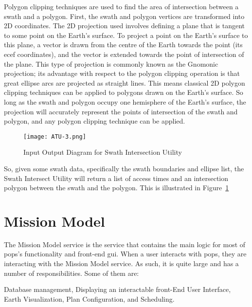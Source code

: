 Polygon clipping techniques are used to find the area of intersection between a
swath and a polygon. First, the swath and polygon vertices are transformed into
2D coordinates. The 2D projection used involves defining a plane that is
tangent to some point on the Earth’s surface.  To project a point on the
Earth’s surface to this plane, a vector is drawn from the centre of the Earth
towards the point (its \gls{ecef} coordinates), and the vector is extended
towards the point of intersection of the plane. This type of projection is
commonly known as the Gnomonic projection; its advantage with respect to the
polygon clipping operation is that great ellipse arcs are projected as straight
lines.  This means classical 2D polygon clipping techniques can be applied to
polygons drawn on the Earth’s surface. So long as the swath and polygon occupy
one hemisphere of the Earth’s surface, the projection will accurately represent
the points of intersection of the swath and polygon, and any polygon clipping
technique can be applied.


\begin{figure}[h]
    \centering
    \texttt{[image: ATU-3.png]} 
    \caption{Input Output Diagram for Swath Intersection Utility}
    \label{fig:atu-3} 
\end{figure}

So, given some swath data, specifically the swath boundaries and ellipse list,
the Swath Intersect Utility will return a list of access times and an
intersection polygon between the swath and the polygon. This is illustrated in
Figure~\ref{fig:atu-3}


\section{Mission Model}
 
The Mission Model service is the service that contains the main logic for most
of \gls{pops}'s functionality and front-end \gls{gui}. When a user interacts
with \gls{pops}, they are interacting with the Mission Model service. As such,
it is quite large and has a number of responsibilities. Some of them are:

\begin{outline} 
    \1 Database management,
    \1 Displaying an interactable front-End User Interface,
    \1 Earth Visualization,
    \1 Plan Configuration, and
    \1 Scheduling.
\end{outline}

